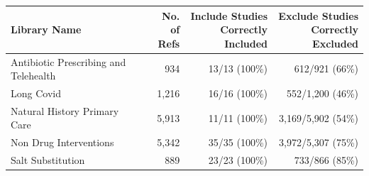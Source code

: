 \begin{tabularx}{\textwidth}{@{} X r r r @{}}
\toprule
\textbf{Library Name} &
\makecell[b]{\textbf{No. of}\\ \textbf{Refs}} &
\makecell[b]{\textbf{Include Studies}\\ \textbf{Correctly Included}} &
\makecell[b]{\textbf{Exclude Studies}\\ \textbf{Correctly Excluded}} \\
\midrule
Antibiotic Prescribing and Telehealth~\cite{antibiotic_prescribing_and_telehealth} & 934 & 13/13 (100\%) & 612/921 (66\%) \\
Long Covid~\cite{long_covid} & 1,216 & 16/16 (100\%) & 552/1,200 (46\%) \\
Natural History Primary Care~\cite{natural_history_primary_care} & 5,913 & 11/11 (100\%) & 3,169/5,902 (54\%) \\
Non Drug Interventions~\cite{non_drug_interventions} & 5,342 & 35/35 (100\%) & 3,972/5,307 (75\%) \\
Salt Substitution~\cite{salt_substitution} & 889 & 23/23 (100\%) & 733/866 (85\%) \\
\bottomrule
\end{tabularx}
